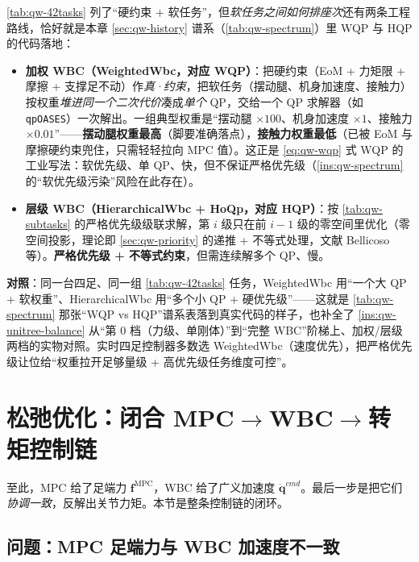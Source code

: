 \begin{insight}\label{ins:qw-weighted-vs-hierarchical}
\cref{tab:qw-42tasks} 列了“硬约束 + 软任务”，但\emph{软任务之间如何排座次}还有两条工程路线，恰好就是本章 \cref{sec:qw-history} 谱系（\cref{tab:qw-spectrum}）里 WQP 与 HQP 的代码落地：
\begin{itemize}
  \item \textbf{加权 WBC（WeightedWbc，对应 WQP）}：把硬约束（EoM + 力矩限 + 摩擦 + 支撑足不动）作\emph{真·约束}，把软任务（摆动腿、机身加速度、接触力）按权重\emph{堆进同一个二次代价}凑成\emph{单个} QP，交给一个 QP 求解器（如 \texttt{qpOASES}）一次解出。一组典型权重是“摆动腿 $\times100$、机身加速度 $\times1$、接触力 $\times0.01$”——\textbf{摆动腿权重最高}（脚要准确落点），\textbf{接触力权重最低}（已被 EoM 与摩擦硬约束兜住，只需轻轻拉向 MPC 值）。这正是 \cref{eq:qw-wqp} 式 WQP 的工业写法：软优先级、单 QP、快，但不保证严格优先级（\cref{ins:qw-spectrum} 的“软优先级污染”风险在此存在）。
  \item \textbf{层级 WBC（HierarchicalWbc + HoQp，对应 HQP）}：按 \cref{tab:qw-subtasks} 的严格优先级级联求解，第 $i$ 级只在前 $i-1$ 级的零空间里优化（零空间投影，理论即 \cref{sec:qw-priority} 的递推 + 不等式处理，文献 Bellicoso 等\cite{bellicoso2016whole}）。\textbf{严格优先级 + 不等式约束}，但需连续解多个 QP、慢。
\end{itemize}
\textbf{对照}：同一台四足、同一组 \cref{tab:qw-42tasks} 任务，WeightedWbc 用“一个大 QP + 软权重”、HierarchicalWbc 用“多个小 QP + 硬优先级”——这就是 \cref{tab:qw-spectrum} 那张“WQP vs HQP”谱系表落到真实代码的样子，也补全了 \cref{ins:qw-unitree-balance} 从“第 $0$ 档（力级、单刚体）”到“完整 WBC”阶梯上、加权/层级两档的实物对照。实时四足控制器多数选 WeightedWbc（速度优先），把严格优先级让位给“权重拉开足够量级 + 高优先级任务维度可控”。
\end{insight}

\section{松弛优化：闭合 MPC\texorpdfstring{$\to$}{->}WBC\texorpdfstring{$\to$}{->}转矩控制链}
\label{sec:qw-relax}

至此，MPC 给了足端力 $\boldsymbol{f}^{\mathrm{MPC}}$，WBC 给了广义加速度 $\ddot{\boldsymbol{q}}^{cmd}$。最后一步是把它们\emph{协调一致}，反解出关节力矩。本节是整条控制链的闭环。

\subsection{问题：MPC 足端力与 WBC 加速度不一致}
\label{subsec:qw-inconsistency}

